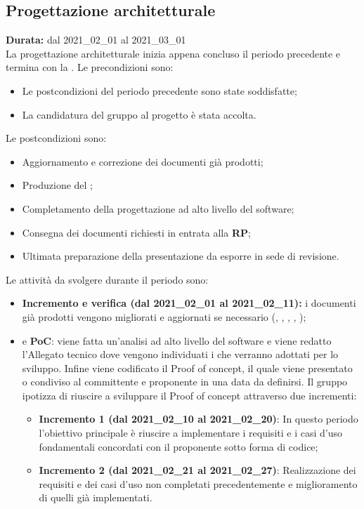\subsection{Progettazione architetturale}
\label{progettazione_architetturale}
\textbf{Durata:} dal 2021\_02\_01 al 2021\_03\_01\\
La progettazione architetturale inizia appena concluso il periodo precedente e termina con la .
Le precondizioni sono:
\begin{itemize}
    \item Le postcondizioni del periodo precedente sono state soddisfatte;
    \item La candidatura del gruppo al progetto {\NomeProgetto} è stata accolta.
\end{itemize}
Le postcondizioni sono:
\begin{itemize}
    \item Aggiornamento e correzione dei documenti già prodotti;
    \item Produzione del ;
    \item Completamento della progettazione ad alto livello del software;
    \item Consegna dei documenti richiesti in entrata alla \textbf{RP};
    \item Ultimata preparazione della presentazione da esporre in sede di revisione.
\end{itemize}
Le attività da svolgere durante il periodo sono:
\begin{itemize}
    \item \textbf{Incremento e verifica (dal 2021\_02\_01 al 2021\_02\_11):} i documenti già prodotti vengono migliorati e aggiornati se necessario ({\NdP}, {\PdP}, {\Glossario}, {\PdQ}, {\AdR});
    \item {} e \textbf{PoC}: viene fatta un'analisi ad alto livello del software e viene redatto l'Allegato tecnico dove vengono individuati i  che verranno adottati per lo sviluppo. Infine viene codificato il Proof of concept, il quale viene presentato o condiviso al committente e proponente in una data da definirsi. Il gruppo ipotizza di riuscire a sviluppare il Proof of concept attraverso due incrementi:
    \begin{itemize}
    	\item \textbf{Incremento 1 (dal 2021\_02\_10 al 2021\_02\_20)}: In questo periodo l'obiettivo principale è riuscire a implementare i requisiti e i casi d'uso fondamentali concordati con il proponente sotto forma di codice;
        \item \textbf{Incremento 2 (dal 2021\_02\_21 al 2021\_02\_27)}: Realizzazione dei requisiti e dei casi d'uso non completati precedentemente e miglioramento di quelli già implementati.
    \end{itemize}
\end{itemize}
\newpage
